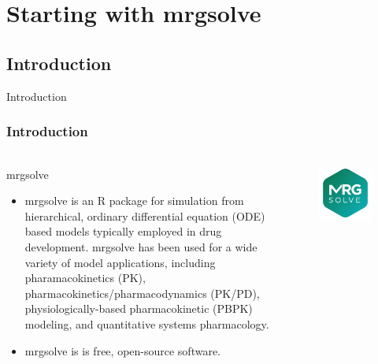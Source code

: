 \documentclass[
	11pt, %
]{beamer}
\begin{document}
\section{Starting with mrgsolve}


\subsection{Introduction}
\begin{frame}[fragile]{Introduction}
	\frametitle{Introduction}
	\framesubtitle{} %
	\begin{columns}[c] 
		\begin{column}{0.75\textwidth}
	\begin{block}{mrgsolve}
	\small
	\begin{itemize}
		\item mrgsolve is an R package for simulation from hierarchical, ordinary differential equation (ODE) based models typically employed in drug development. mrgsolve has been used for a wide variety of model applications, including pharamacokinetics (PK), pharmacokinetics/pharmacodynamics (PK/PD), physiologically-based pharmacokinetic (PBPK) modeling, and quantitative systems pharmacology. 
		\item mrgsolve is is free, open-source software.
		\end{itemize}
	\end{block}
	\end{column}
		\begin{column}{0.25\textwidth} %
\begin{figure}
   \includegraphics[width= 0.7\linewidth]{../Figures/MRG-Solve-Hex.png}
\end{figure}
		\end{column}
	\end{columns}
	\end{frame}
	
\end{document}
